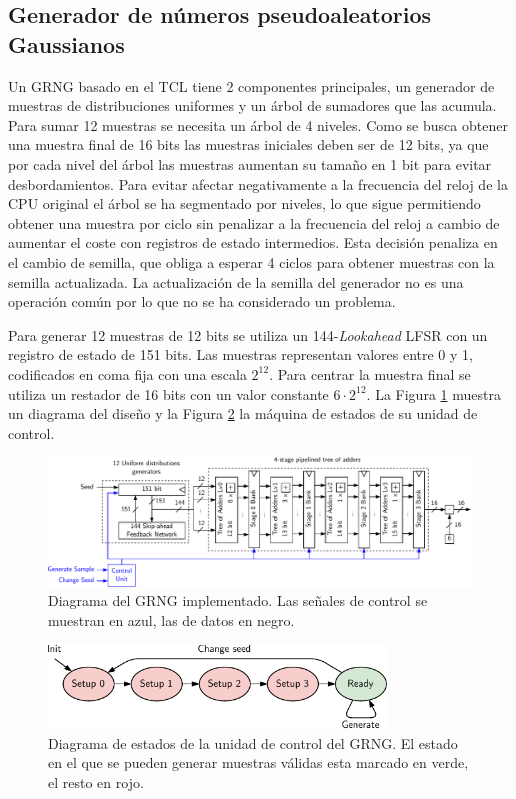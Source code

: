 \subsection{Generador de números pseudoaleatorios Gaussianos}

Un GRNG basado en el TCL tiene 2 componentes principales, un generador de muestras de distribuciones uniformes y un árbol de sumadores que las acumula. Para sumar 12 muestras se necesita un árbol de 4 niveles. Como se busca obtener una muestra final de 16 bits las muestras iniciales deben ser de 12 bits, ya que por cada nivel del árbol las muestras aumentan su tamaño en 1 bit para evitar desbordamientos. Para evitar afectar negativamente a la frecuencia del reloj de la CPU original el árbol se ha segmentado por niveles, lo que sigue permitiendo obtener una muestra por ciclo sin penalizar a la frecuencia del reloj a cambio de aumentar el coste con registros de estado intermedios. Esta decisión penaliza en el cambio de semilla, que obliga a esperar 4 ciclos para obtener muestras con la semilla actualizada. La actualización de la semilla del generador no es una operación común por lo que no se ha considerado un problema.

Para generar 12 muestras de 12 bits se utiliza un 144-\textit{Lookahead} LFSR con un registro de estado de 151 bits. Las muestras representan valores entre 0 y 1, codificados en coma fija con una escala $2^{12}$. Para centrar la muestra final se utiliza un restador de 16 bits con un valor constante $6 \cdot 2^{12}$. La Figura \ref{fig:grng} muestra un diagrama del diseño y la Figura \ref{fig:grng_state} la máquina de estados de su unidad de control.

\begin{figure}[h]
    \centering
    \includegraphics[width=\textwidth]{root/Imagenes/riscv_ext/grng.pdf}
    \caption{Diagrama del GRNG implementado. Las señales de control se muestran en azul, las de datos en negro.}
    \label{fig:grng}
\end{figure}

\begin{figure}[h]
    \centering
    \includegraphics[width=0.8\textwidth]{root/Imagenes/riscv_ext/grng_states.pdf}
    \caption{Diagrama de estados de la unidad de control del GRNG. El estado en el que se pueden generar muestras válidas esta marcado en verde, el resto en rojo.}
    \label{fig:grng_state}
\end{figure}

